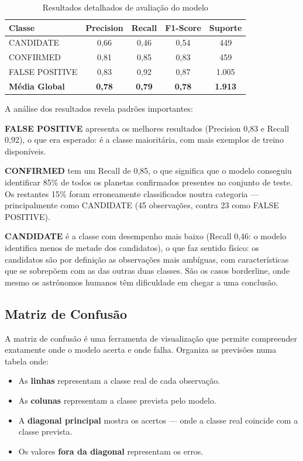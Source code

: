\documentclass[12pt, a4paper]{report}
\begin{document}
\begin{table}[h]
\centering
\caption{Resultados detalhados de avaliação do modelo}
\begin{tabular}{lcccc}
\toprule
\textbf{Classe} & \textbf{Precision} & \textbf{Recall} & \textbf{F1-Score} & \textbf{Suporte} \\
\midrule
CANDIDATE & 0,66 & 0,46 & 0,54 & 449 \\
CONFIRMED & 0,81 & 0,85 & 0,83 & 459 \\
FALSE POSITIVE & 0,83 & 0,92 & 0,87 & 1.005 \\
\midrule
\textbf{Média Global} & \textbf{0,78} & \textbf{0,79} & \textbf{0,78} & \textbf{1.913} \\
\bottomrule
\end{tabular}
\end{table}

A análise dos resultados revela padrões importantes:

\textbf{FALSE POSITIVE} apresenta os melhores resultados (Precision 0,83 e Recall 0,92), o que era esperado: é a classe maioritária, com mais exemplos de treino disponíveis.

\textbf{CONFIRMED} tem um Recall de 0,85, o que significa que o modelo conseguiu identificar 85\% de todos os planetas confirmados presentes no conjunto de teste. Os restantes 15\% foram erroneamente classificados noutra categoria — principalmente como CANDIDATE (45 observações, contra 23 como FALSE POSITIVE).

\textbf{CANDIDATE} é a classe com desempenho mais baixo (Recall 0,46: o modelo identifica menos de metade dos candidatos), o que faz sentido físico: os candidatos são por definição as observações mais ambíguas, com características que se sobrepõem com as das outras duas classes. São os casos borderline, onde mesmo os astrónomos humanos têm dificuldade em chegar a uma conclusão.

\subsection{Matriz de Confusão}

A matriz de confusão é uma ferramenta de visualização que permite compreender exatamente onde o modelo acerta e onde falha. Organiza as previsões numa tabela onde:

\begin{itemize}
    \item As \textbf{linhas} representam a classe real de cada observação.
    \item As \textbf{colunas} representam a classe prevista pelo modelo.
    \item A \textbf{diagonal principal} mostra os acertos — onde a classe real coincide com a classe prevista.
    \item Os valores \textbf{fora da diagonal} representam os erros.
\end{itemize}
\end{document}
